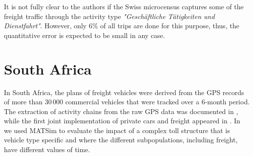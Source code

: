 It is not fully clear to the authors if the Swiss microcensus captures some of the freight traffic through the activity type \emph{"Geschäftliche Tätigkeiten und Dienstfahrt"}. However, only $6\%$ of all trips are done for this purpose, thus, the quantitative error is expected to be small in any case.

\section{South Africa}
In South Africa, the plans of freight vehicles were derived from the GPS records of more than 30\,000 commercial vehicles  that were tracked over a 6-month period. The extraction of activity chains from the raw GPS data was documented in \citet[][]{JoubertAxhausen_JTG_2011}, while the first joint implementation of private cars and freight appeared in \citet[][]{JoubertJEtAl_TRR_2010}. In \citet[][]{NagelKickhoeferJoubert2014HeterogeneousVoTsPROCEDIA} we used MATSim to evaluate the impact of a complex toll structure that is vehicle type specific and where the different subpopulations, including freight, have different values of time.

